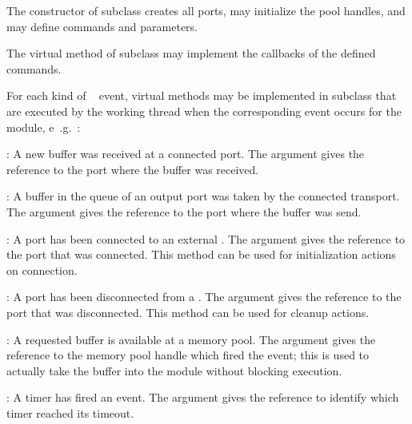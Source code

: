 \begin{compactenum}

\item  The constructor of  subclass  creates all 
      ports, may initialize the pool handles, and may 
      define commands and parameters. 
\item  The virtual  method of  
      subclass may implement the callbacks of the defined commands.

\item  For each kind of \dabc~ event, virtual methods  may be
implemented in  subclass that are executed 
by the working thread when the corresponding event occurs for the module, e~.g.~:
\begin{compactdesc}
	\item [\func{void ProcessInputEvent(Port* port)}] : 
	A new buffer was received at a connected port. The  argument
	gives the reference to the port where the buffer was received.
	
	\item [\func{void ProcessOutputEvent(Port* port)}] :
	A buffer in the queue of an output port was taken by the connected
	transport. The  argument
	gives the reference to the port where the buffer was send.
	 
	 \item [\func{void ProcessConnectEvent(Port* port)}] :
	 A port has been connected to an external .
	  The  argument
	gives the reference to the port that was connected. This method can
	be used for initialization actions on connection.
	  
         \item  [\func{void ProcessDisconnectEvent(Port* port)}]:	
 	A port has been disconnected from a .
	  The  argument gives the reference to the port that 
	  was disconnected. This method can be used for cleanup actions.
	
         \item [\func{void ProcessPoolEvent(PoolHandle* pool)}]: 
	 A requested buffer is available at a memory pool.  The
	  argument gives the reference to the memory 
	 pool handle which fired the event; this is used to actually take the
	 buffer into the module without blocking execution.
          
	  \item [\func{void ProcessTimerEvent(Timer* timer)}]:
	  A timer has fired an event.  The
	  argument gives the reference to identify which
	 timer reached its timeout.  
        

\end{compactdesc}
\end{compactenum}
